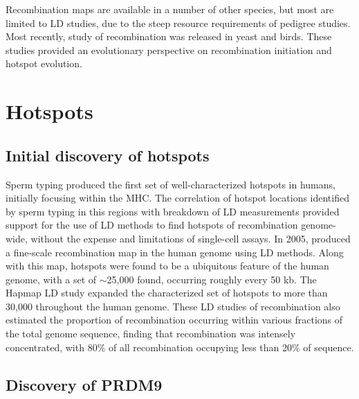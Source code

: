 Recombination maps are available in a number of other species, but most are limited to LD studies, due to the steep resource requirements of pedigree studies.
Most recently, study of recombination was released in yeast\cite{Lam2015} and birds\cite{Singhal2015}.
These studies provided an evolutionary perspective on recombination initiation and hotspot evolution.



\section{Hotspots}

\subsection{Initial discovery of hotspots}

Sperm typing produced the first set of well-characterized hotspots in humans, initially focusing within the MHC\cite{Jeffreys2000,Jeffreys2001}.
The correlation of hotspot locations identified by sperm typing in this regions with breakdown of LD measurements provided support for the use of LD methods to find hotspots of recombination genome-wide, without the expense and limitations of single-cell assays\cite{Jeffreys2001}.
In 2005, \citet{Myers2005} produced a fine-scale recombination map in the human genome using LD methods.
Along with this map, hotspots were found to be a ubiquitous feature of the human genome, with a set of $\sim$25,000 found, occurring roughly every 50 kb.
The Hapmap LD study expanded the characterized set of hotspots to more than 30,000 throughout the human genome\cite{hapmap2007}.
These LD studies of recombination also estimated the proportion of recombination occurring within various fractions of the total genome sequence, finding that recombination was intensely concentrated, with 80\% of all recombination occupying less than 20\% of sequence.



\subsection{Discovery of PRDM9}


